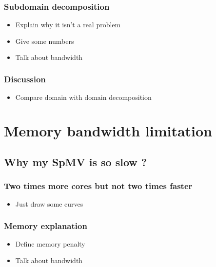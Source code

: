 \documentclass[oneside,12t]{classes/Thesis}
\begin{document}
\subsection{Subdomain decomposition}
  \begin{itemize}
    \item Explain why it isn't a real problem
    \item Give some numbers
    \item Talk about bandwidth
  \end{itemize}
\subsection{Discussion}
  \begin{itemize}
    \item Compare domain with domain decomposition
  \end{itemize}





\chapter{Memory bandwidth limitation}
\minitoc
\vspace{1cm}
\section{Why my SpMV is so slow ?}
\subsection{Two times more cores but not two times faster}
  \begin{itemize}
    \item Just draw some curves
  \end{itemize}
\subsection{Memory explanation}
  \begin{itemize}
    \item Define memory penalty
    \item Talk about bandwidth
  \end{itemize}
\end{document}
